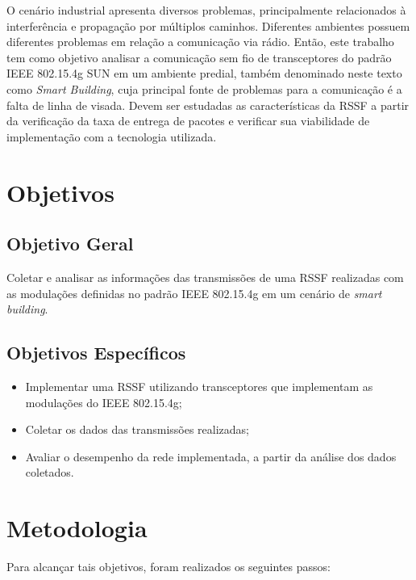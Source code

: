 O cenário industrial apresenta diversos problemas, principalmente relacionados à interferência e propagação por múltiplos caminhos. Diferentes ambientes possuem diferentes problemas em relação a comunicação via rádio. Então, este trabalho tem como objetivo analisar a comunicação sem fio de transceptores do padrão IEEE 802.15.4g SUN em um ambiente predial, também denominado neste texto como \emph{Smart Building}, cuja principal fonte de problemas para a comunicação é a falta de linha de visada. Devem ser estudadas as características da RSSF a partir da verificação da taxa de entrega de pacotes e verificar sua viabilidade de implementação com a tecnologia utilizada.

\section{Objetivos}
\label{sec:objetivos}

\subsection{Objetivo Geral}
\label{subsec:objGeral}
Coletar e analisar as informações das transmissões de uma RSSF realizadas com as modulações definidas no padrão IEEE 802.15.4g em um cenário de \emph{smart building}.


\subsection{Objetivos Específicos}
\label{subsec:objespecificos}
\begin{itemize}
      \item Implementar uma RSSF utilizando transceptores que implementam as modulações do IEEE 802.15.4g;
      \item Coletar os dados das transmissões realizadas;
      \item Avaliar o desempenho da rede implementada, a partir da análise dos dados coletados.
\end{itemize}


\section{Metodologia}
\label{sec:metodologia}
Para alcançar tais objetivos, foram realizados os seguintes passos:


